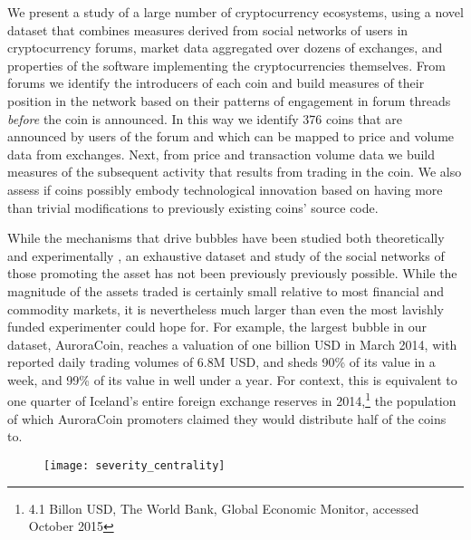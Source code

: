 
We present a study of a large number of cryptocurrency ecosystems, 
using a novel dataset that combines measures derived from social networks of users in cryptocurrency forums, market data aggregated over dozens of exchanges, and properties of the software implementing the cryptocurrencies themselves.
From forums we identify the introducers of each coin and build measures of their position in the network based on
their patterns of engagement in forum threads
\emph{before} the coin is announced.
In this way we identify 376 coins that are announced by users of the forum and which can be mapped to price and volume data from exchanges.
Next, from price and transaction volume data we build measures of the subsequent activity that results from trading in the coin. 
We also assess if coins possibly embody technological innovation based on having more than trivial modifications to previously existing coins' source code.



While the mechanisms that drive bubbles have been studied both theoretically 
\cite{abolafia1988enacting, earl2007decision, bakker2010social, harras2011grow}
and experimentally
\cite{moinas2013bubble},
an exhaustive dataset and study of the social networks of those promoting the asset has not been previously previously possible.
While the magnitude of the assets traded is certainly small relative to most financial and commodity markets, it is nevertheless much larger than
even the most lavishly funded experimenter could hope for.
For example, the largest bubble in our dataset, AuroraCoin, reaches a valuation of one billion USD in March 2014,
with reported daily trading volumes of 6.8M USD, and sheds 90\% of its value in a week, and 99\% of its value in well under a year.
For context, this is equivalent to one quarter of Iceland's entire foreign exchange reserves in 2014,\footnote{4.1 Billon USD, The World Bank, Global Economic Monitor, accessed October 2015} the population of which AuroraCoin promoters claimed they would distribute half of the coins to.

\begin{figure}
\texttt{[image: severity\_centrality]}
\end{figure}

